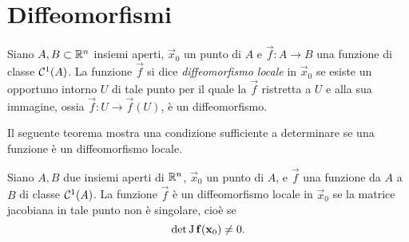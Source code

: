 \section{Diffeomorfismi}
\begin{definizione} \label{d:diffeomorfismo-locale}
	Siano $A,B\subset\mathbb{R}^n$ insiemi aperti, $\vec x_0$ un punto di $A$ e $\vec f\colon A\to B$ una funzione di classe $\mathcal{C}^{{1}}(A)$. La funzione $\vec f$ si dice \emph{diffeomorfismo locale} in $\vec x_0$ se esiste un opportuno intorno $U$ di tale punto per il quale la $\vec f$ ristretta a $U$ e alla sua immagine, ossia $\vec f\colon U\to \vec f(U)$, è un diffeomorfismo.
\end{definizione}
Il seguente teorema mostra una condizione sufficiente a determinare se una funzione è un diffeomorfismo locale.
\begin{teorema} \label{t:invertibilita-locale}
	Siano $A,B$ due insiemi aperti di $\mathbb{R}^n$, $\vec x_0$ un punto di $A$, e $\vec f$ una funzione da $A$ a $B$ di classe $\mathcal{C}^{{1}}(A)$.
	La funzione $\vec f$ è un diffeomorfismo locale in $\vec x_0$ se la matrice jacobiana in tale punto non è singolare, cioè se
	\begin{equation} 
		\det\operatorname{J}\mathbf{f}(\mathbf{x}_0)\neq 0.
		\label{eq:invertibilita-locale-determinante-jacobiana}
	\end{equation}
\end{teorema}
